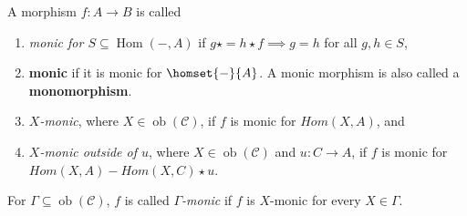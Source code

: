 \begin{definition}
    A morphism $f : A \to B$ is called 
    \begin{enumerate}[label=(\roman*)] 
        \item 
            \emph{monic for $S \subseteq \operatorname{Hom}(-,A)$} 
            if $g \star = h \star f \implies g = h$ for all $g,h \in S$,
        \item \textbf{monic} if it is monic for $\homset{-}{A}$. A monic morphism is also called a \textbf{monomorphism}.
        \item 
            \emph{$X$-monic}, where $X \in \operatorname{ob}(\mathcal{C})$, if $f$ is monic for $Hom(X,A)$, and
        \item 
            \emph{$X$-monic outside of $u$}, where $X \in \operatorname{ob}(\mathcal{C})$ and $u : C \to A$, if $f$ is monic for $Hom(X,A) -  Hom(X,C) \star u$.
    \end{enumerate}
    For $\Gamma \subseteq \operatorname{ob}(\mathcal{C})$, $f$ is called \emph{$\Gamma$-monic} if $f$ is $X$-monic for every $X \in \Gamma$.
\end{definition}